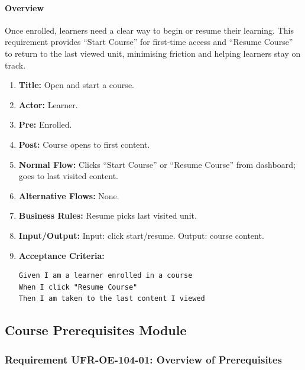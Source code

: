 \paragraph{Overview}
Once enrolled, learners need a clear way to begin or resume their learning. This requirement provides “Start Course” for first‑time access and “Resume Course” to return to the last viewed unit, minimising friction and helping learners stay on track.
\begin{enumerate}[label=\textbf{\arabic*.}]
\item \textbf{Title:} Open and start a course.
\item \textbf{Actor:} Learner.
\item \textbf{Pre:} Enrolled.
\item \textbf{Post:} Course opens to first content.
\item \textbf{Normal Flow:} Clicks “Start Course” or “Resume Course” from dashboard; goes to last visited content.
\item \textbf{Alternative Flows:} None.
\item \textbf{Business Rules:} Resume picks last visited unit.
\item \textbf{Input/Output:} Input: click start/resume. Output: course content.
\item \textbf{Acceptance Criteria:}
    \begin{verbatim}
Given I am a learner enrolled in a course
When I click "Resume Course"
Then I am taken to the last content I viewed
    \end{verbatim}
\end{enumerate}

\subsection{Course Prerequisites Module}
\subsubsection{Requirement UFR-OE-104-01: Overview of Prerequisites}

